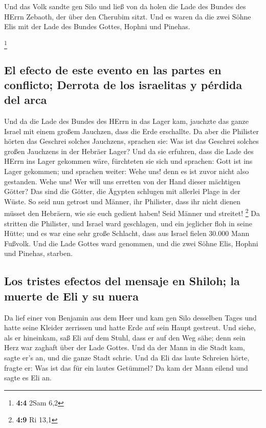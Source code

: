  Und das Volk sandte gen Silo und ließ von da holen die
Lade des Bundes des HErrn Zebaoth, der über den Cherubim sitzt. Und es
waren da die zwei Söhne Elis mit der Lade des Bundes Gottes, Hophni und
Pinehas.

\footnote{\textbf{4:4} 2Sam 6,2}

\hypertarget{el-efecto-de-este-evento-en-las-partes-en-conflicto-derrota-de-los-israelitas-y-puxe9rdida-del-arca}{%
\subsection{El efecto de este evento en las partes en conflicto; Derrota
de los israelitas y pérdida del
arca}\label{el-efecto-de-este-evento-en-las-partes-en-conflicto-derrota-de-los-israelitas-y-puxe9rdida-del-arca}}

 Und da die Lade des Bundes des HErrn in das Lager kam,
jauchzte das ganze Israel mit einem großem Jauchzen, dass die Erde
erschallte.  Da aber die Philister hörten das Geschrei
solches Jauchzens, sprachen sie: Was ist das Geschrei solches großen
Jauchzens in der Hebräer Lager? Und da sie erfuhren, dass die Lade des
HErrn ins Lager gekommen wäre,  fürchteten sie sich und
sprachen: Gott ist ins Lager gekommen; und sprachen weiter: Wehe uns!
denn es ist zuvor nicht also gestanden.  Wehe uns! Wer
will uns erretten von der Hand dieser mächtigen Götter? Das sind die
Götter, die Ägypten schlugen mit allerlei Plage in der Wüste.
 So seid nun getrost und Männer, ihr Philister, dass ihr
nicht dienen müsset den Hebräern, wie sie euch gedient haben! Seid
Männer und streitet! \footnote{\textbf{4:9} Ri 13,1}  Da
stritten die Philister, und Israel ward geschlagen, und ein jeglicher
floh in seine Hütte; und es war eine sehr große Schlacht, dass aus
Israel fielen 30.000 Mann Fußvolk.  Und die Lade Gottes
ward genommen, und die zwei Söhne Elis, Hophni und Pinehas, starben.

\hypertarget{los-tristes-efectos-del-mensaje-en-shiloh-la-muerte-de-eli-y-su-nuera}{%
\subsection{Los tristes efectos del mensaje en Shiloh; la muerte de Eli
y su
nuera}\label{los-tristes-efectos-del-mensaje-en-shiloh-la-muerte-de-eli-y-su-nuera}}

 Da lief einer von Benjamin aus dem Heer und kam gen Silo
desselben Tages und hatte seine Kleider zerrissen und hatte Erde auf
sein Haupt gestreut.  Und siehe, als er hineinkam, saß
Eli auf dem Stuhl, dass er auf den Weg sähe; denn sein Herz war zaghaft
über der Lade Gottes. Und da der Mann in die Stadt kam, sagte er's an,
und die ganze Stadt schrie.  Und da Eli das laute
Schreien hörte, fragte er: Was ist das für ein lautes Getümmel? Da kam
der Mann eilend und sagte es Eli an.

